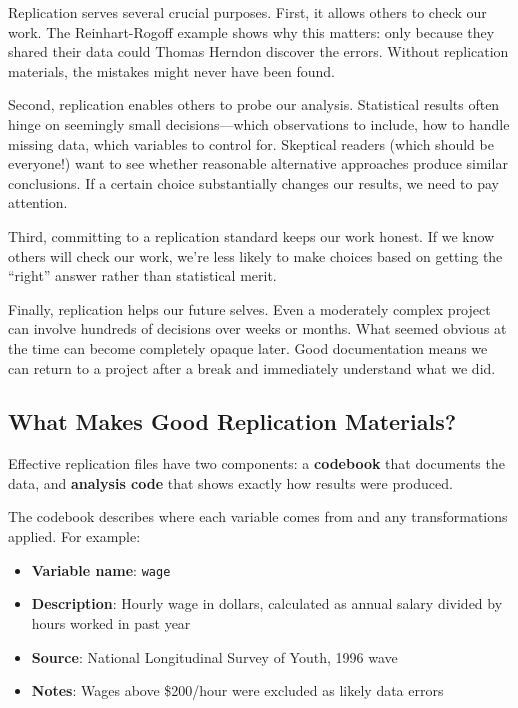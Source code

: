 \documentclass[
  letterpaper,
  DIV=11,
  numbers=noendperiod]{scrreprt}
\providecommand{\tightlist}{%
  \setlength{\itemsep}{0pt}\setlength{\parskip}{0pt}}
\begin{document}
Replication serves several crucial purposes. First, it allows others to
check our work. The Reinhart-Rogoff example shows why this matters: only
because they shared their data could Thomas Herndon discover the errors.
Without replication materials, the mistakes might never have been found.

Second, replication enables others to probe our analysis. Statistical
results often hinge on seemingly small decisions---which observations to
include, how to handle missing data, which variables to control for.
Skeptical readers (which should be everyone!) want to see whether
reasonable alternative approaches produce similar conclusions. If a
certain choice substantially changes our results, we need to pay
attention.

Third, committing to a replication standard keeps our work honest. If we
know others will check our work, we're less likely to make choices based
on getting the ``right'' answer rather than statistical merit.

Finally, replication helps our future selves. Even a moderately complex
project can involve hundreds of decisions over weeks or months. What
seemed obvious at the time can become completely opaque later. Good
documentation means we can return to a project after a break and
immediately understand what we did.

\subsection{What Makes Good Replication
Materials?}\label{what-makes-good-replication-materials}

Effective replication files have two components: a \textbf{codebook}
that documents the data, and \textbf{analysis code} that shows exactly
how results were produced.

The codebook describes where each variable comes from and any
transformations applied. For example:

\begin{itemize}
\tightlist
\item
  \textbf{Variable name}: \texttt{wage}
\item
  \textbf{Description}: Hourly wage in dollars, calculated as annual
  salary divided by hours worked in past year
\item
  \textbf{Source}: National Longitudinal Survey of Youth, 1996 wave
\item
  \textbf{Notes}: Wages above \$200/hour were excluded as likely data
  errors
\end{itemize}
\end{document}
